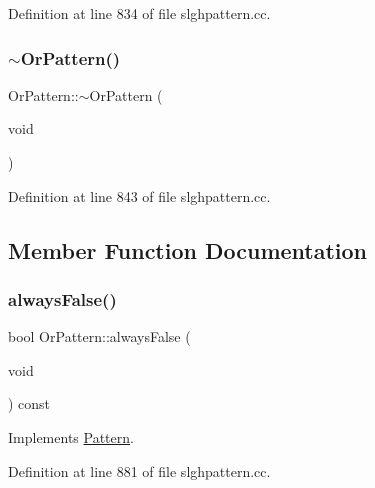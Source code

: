 Definition at line 834 of file slghpattern.\+cc.

\mbox{\label{class_or_pattern_a83f4a4614840c6ebbaf034473b1492eb}} 
\subsubsection{\texorpdfstring{$\sim$OrPattern()}{~OrPattern()}}
{\footnotesize\ttfamily Or\+Pattern\+::$\sim$\+Or\+Pattern (\begin{DoxyParamCaption}\item[{void}]{ }\end{DoxyParamCaption})\hspace{0.3cm}{\ttfamily [virtual]}}



Definition at line 843 of file slghpattern.\+cc.



\subsection{Member Function Documentation}
\mbox{\label{class_or_pattern_a8c30dc08477e285537c42e7246ec4d0e}} 
\subsubsection{\texorpdfstring{alwaysFalse()}{alwaysFalse()}}
{\footnotesize\ttfamily bool Or\+Pattern\+::always\+False (\begin{DoxyParamCaption}\item[{void}]{ }\end{DoxyParamCaption}) const\hspace{0.3cm}{\ttfamily [virtual]}}



Implements \mbox{\hyperlink{class_pattern_ab7e66817fda44ad29954c8cfcb9c9266}{Pattern}}.



Definition at line 881 of file slghpattern.\+cc.

\mbox{\label{class_or_pattern_af5c30dcc861e051d0c741cf5989f657f}} 
